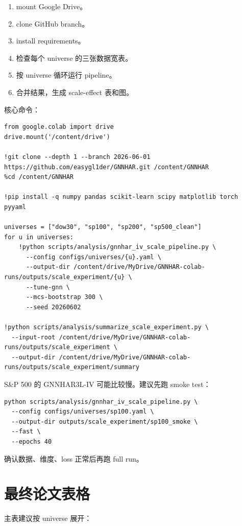\documentclass[11pt,a4paper]{ctexart}
\begin{document}
\begin{enumerate}[leftmargin=*]
\item mount Google Drive。
\item clone GitHub branch。
\item install requirements。
\item 检查每个 universe 的三张数据宽表。
\item 按 universe 循环运行 pipeline。
\item 合并结果，生成 scale-effect 表和图。
\end{enumerate}

核心命令：

\begin{lstlisting}
from google.colab import drive
drive.mount('/content/drive')

!git clone --depth 1 --branch 2026-06-01 https://github.com/easygl1der/GNNHAR.git /content/GNNHAR
%cd /content/GNNHAR

!pip install -q numpy pandas scikit-learn scipy matplotlib torch pyyaml

universes = ["dow30", "sp100", "sp200", "sp500_clean"]
for u in universes:
    !python scripts/analysis/gnnhar_iv_scale_pipeline.py \
      --config configs/universes/{u}.yaml \
      --output-dir /content/drive/MyDrive/GNNHAR-colab-runs/outputs/scale_experiment/{u} \
      --tune-gnn \
      --mcs-bootstrap 300 \
      --seed 20260602

!python scripts/analysis/summarize_scale_experiment.py \
  --input-root /content/drive/MyDrive/GNNHAR-colab-runs/outputs/scale_experiment \
  --output-dir /content/drive/MyDrive/GNNHAR-colab-runs/outputs/scale_experiment/summary
\end{lstlisting}

S\&P 500 的 GNNHAR3L-IV 可能比较慢。建议先跑 smoke test：

\begin{lstlisting}
python scripts/analysis/gnnhar_iv_scale_pipeline.py \
  --config configs/universes/sp100.yaml \
  --output-dir outputs/scale_experiment/sp100_smoke \
  --fast \
  --epochs 40
\end{lstlisting}

确认数据、维度、loss 正常后再跑 full run。

\section{最终论文表格}

主表建议按 universe 展开：
\end{document}
